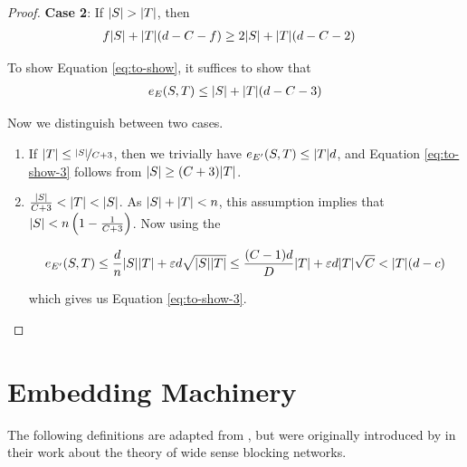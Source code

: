 \documentclass[11pt]{article}
\begin{document}
\begin{proof}
\textbf{Case 2}: If $\Size{S} > \Size{T}$, then 
  \begin{align}
    f\Size{S} +  \Size{T}(d-C-f)  &\ge 2\Size{S} +\Size{T}(d-C-2) \label{eq:to-show-2}
  \end{align}
  
  To show Equation \eqref{eq:to-show}, it suffices to show that
\begin{align}
  \CutEdges{S}{T}{E} \leq \Size{S} + \Size{T}(d-C-3) \label{eq:to-show-3}
\end{align}

Now we distinguish between two cases.

\begin{enumerate}

\item{
    If $\Size{T} \le \nicefrac{\Size{S}}{C+3}$, then we trivially have $\CutEdges{S}{T}{E'} \leq \Size{T}d$, and Equation \eqref{eq:to-show-3} follows from $\Size{S} \geq (C+3)\Size{T}$.
  }

\item{
$ \frac{\Size{S}}{C+3} < \Size{T} < \Size{S}$. As $\Size{S} + \Size{T} < n$, this assumption implies that $\Size{S} < n\left(1 - \frac{1}{C+3}\right)$.
Now using the 

\[ \CutEdges{S}{T}{E'} \le \frac{d}{n}\Size{S}\Size{T} + \epsilon d \sqrt{\Size{S}\Size{T}} \le \frac{(C-1)d}{D}\Size{T} + \epsilon d \Size{T}\sqrt{C} < \Size{T}(d-c)\]

which gives us Equation \eqref{eq:to-show-3}.
  }
  
\end{enumerate}


\end{proof}  

\section{Embedding Machinery}
\label{sec:embed-machinery}

The following definitions are adapted from \citep{nenadov2023routing}, but were originally introduced by \citet{feldman1988wide} in their work about the theory of wide sense blocking networks.
\end{document}
